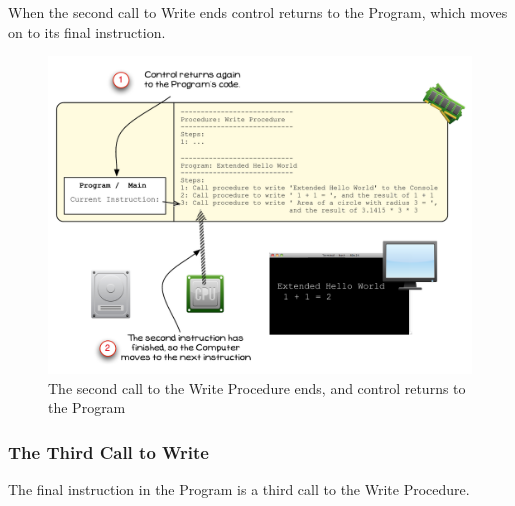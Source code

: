 When the second call to Write ends control returns to the Program, which moves on to its final instruction.

\begin{figure}[htbp]
   \centering
   \includegraphics[width=\textwidth]{./topics/program-creation/images/ProgramExecution08} 
   \caption{The second call to the Write Procedure ends, and control returns to the Program}
   \label{fig:program-creation-visualise-helloworld-8}
\end{figure}


\clearpage
\subsubsection{The Third Call to Write} %
\label{ssub:third_call_to_write}

The final instruction in the Program is a third call to the Write Procedure. 

